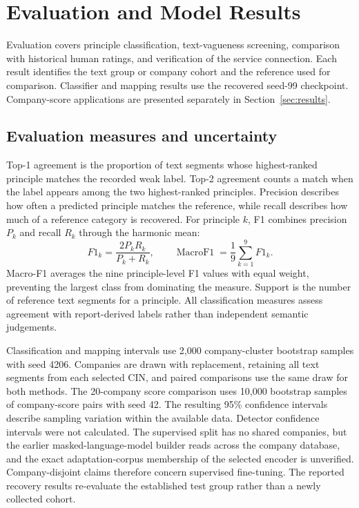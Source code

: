 \section{Evaluation and Model Results}
\label{sec:evaluation}

Evaluation covers principle classification, text-vagueness screening, comparison with historical human ratings, and verification of the service connection. Each result identifies the text group or company cohort and the reference used for comparison. Classifier and mapping results use the recovered seed-99 checkpoint. Company-score applications are presented separately in Section~\ref{sec:results}.

\subsection{Evaluation measures and uncertainty}

Top-1 agreement is the proportion of text segments whose highest-ranked principle matches the recorded weak label. Top-2 agreement counts a match when the label appears among the two highest-ranked principles. Precision describes how often a predicted principle matches the reference, while recall describes how much of a reference category is recovered. For principle $k$, F1 combines precision $P_k$ and recall $R_k$ through the harmonic mean:
\begin{equation}
F1_k=\frac{2P_kR_k}{P_k+R_k},\qquad
\operatorname{MacroF1}=\frac{1}{9}\sum_{k=1}^{9}F1_k.
\label{eq:f1}
\end{equation}
Macro-F1 averages the nine principle-level F1 values with equal weight, preventing the largest class from dominating the measure. Support is the number of reference text segments for a principle. All classification measures assess agreement with report-derived labels rather than independent semantic judgements.

Classification and mapping intervals use 2,000 company-cluster bootstrap samples with seed 4206. Companies are drawn with replacement, retaining all text segments from each selected CIN, and paired comparisons use the same draw for both methods. The 20-company score comparison uses 10,000 bootstrap samples of company-score pairs with seed 42. The resulting 95\% confidence intervals describe sampling variation within the available data. Detector confidence intervals were not calculated. The supervised split has no shared companies, but the earlier masked-language-model builder reads across the company database, and the exact adaptation-corpus membership of the selected encoder is unverified. Company-disjoint claims therefore concern supervised fine-tuning. The reported recovery results re-evaluate the established test group rather than a newly collected cohort.

